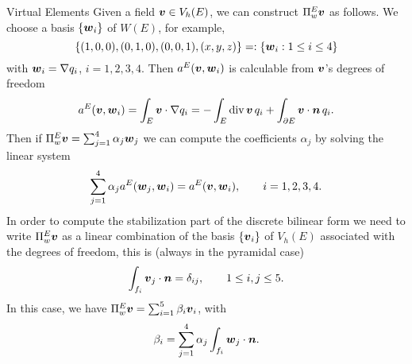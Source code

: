 \begin{chapter}{Virtual Elements}
Given a field $\boldsymbol{v} \in V_h(E)$, we can construct $\Pi_w^E\boldsymbol{v}$
as follows. We choose a basis $\{\boldsymbol{w}_i\}$ of $W(E)$, for
example,
\[
\left\{ (1,0,0), (0,1,0), (0,0,1), (x,y,z) \right\} =: \{
\boldsymbol{w}_i: 1\le i\le4\}
\]
with $\boldsymbol{w}_i=\nabla q_i$, $i=1,2,3,4$. Then $a^E(\boldsymbol{v},\boldsymbol{w}_i)$ is calculable from $\boldsymbol{v}$'s degrees of freedom
\[
a^E(\boldsymbol{v},\boldsymbol{w}_i) = \int_E\boldsymbol{v}\cdot\nabla q_i =
-\int_E\mbox{div\,}\boldsymbol{v}\,q_i + \int_{\partial E}\boldsymbol{v}\cdot\boldsymbol{n}\,q_i.
\]
Then if $\Pi_w^E\boldsymbol{v}=\sum_{j=1}^4\alpha_j\boldsymbol{w}_j$ we can
compute the coefficients $\alpha_j$ by solving the linear system
\[
\sum_{j=1}^4\alpha_j a^E(\boldsymbol{w}_j,\boldsymbol{w}_i) =
a^E(\boldsymbol{v},\boldsymbol{w}_i), \qquad i=1,2,3,4.
\]
In order to compute the stabilization part of the discrete
bilinear form we need to write $\Pi_w^E\boldsymbol{v}$ as a linear
combination of the basis $\{\boldsymbol{v}_i\}$ of $V_h(E)$ associated with
the degrees of freedom, this is (always in the pyramidal case)
\[
\int_{f_i}\boldsymbol{v}_j\cdot\boldsymbol{n} =\delta_{ij}, \qquad 1\le i,j\le 5.
\]
In this case, we have $\Pi_w^E\boldsymbol{v} = \sum_{i=1}^5\beta_i\boldsymbol{v}_i$,
with
\[
\beta_i=\sum_{j=1}^4\alpha_j\int_{f_i}\boldsymbol{w}_j\cdot\boldsymbol{n}.
\]




\end{chapter}


